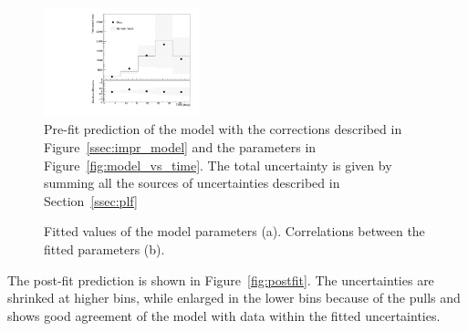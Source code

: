 \begin{figure}
\centering
\includegraphics[width=0.4\textwidth]{imgs/Covid/ModelPrefit.pdf} 
  \caption{Pre-fit prediction of the model with the corrections described in Figure~\ref{ssec:impr_model} and the parameters in Figure~\ref{fig:model_vs_time}. The total uncertainty is given by summing all the sources of uncertainties described in Section~\ref{ssec:plf}}
  \label{fig:prefit}
\end{figure}

\begin{figure}
\centering
{}
  \caption{Fitted values of the model parameters (a). Correlations between the fitted parameters (b).}
  \label{fig:nps}
\end{figure}

The post-fit prediction is shown in Figure~\ref{fig:postfit}. The uncertainties are shrinked at higher bins, while enlarged in the lower bins because of the pulls and shows good agreement of the model with data within the fitted uncertainties.

